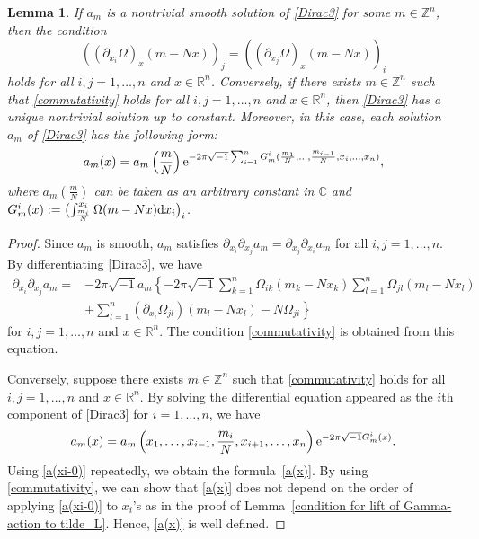 \documentclass[pdftex]{sigma}
\numberwithin{equation}{section}
\newtheorem{Lemma}[Theorem]{Lemma}
\newcommand{\C}{\mathbb{C}}
\newcommand{\R}{\mathbb{R}}
\newcommand{\Z}{\mathbb{Z}}
\begin{document}
\begin{Lemma}\label{basis of kerD}
If $a_m$ is a nontrivial smooth solution of \eqref{Dirac3} for some $m\in \Z^n$, then the condition
\begin{equation}\label{commutativity}
\left(\left(\partial_{x_i}\Omega\right)_x(m-Nx)\right)_j=\left(\left(\partial_{x_j}\Omega\right)_x(m-Nx)\right)_i
\end{equation}
holds  for all $i, j=1,\ldots , n$ and $x\in \R^n$.
Conversely, if there exists $m\in \Z^n$ such that \eqref{commutativity} holds for all $i, j=1,\ldots , n$ and $x\in \R^n$,
then \eqref{Dirac3} has a unique nontrivial solution up to constant. Moreover, in this case, each solution $a_m$ of \eqref{Dirac3} has the following form:
\begin{equation}\label{a(x)}
a_m(x)=a_m\left(\frac{m}{N}\right){\rm e}^{-2\pi\sqrt{-1}\sum_{i=1}^nG_m^i(\frac{m_1}{N},\ldots ,\frac{m_{i-1}}{N},x_i,\ldots ,x_n)},
\end{equation}
where $a_m(\frac{m}{N})$ can be taken as an arbitrary constant in $\C$ and
$
G_m^i(x):=\bigl(\int_{\frac{m_i}{N}}^{x_i}\Omega(m-Nx){\rm d}x_i\bigr)_i $.
\end{Lemma}
\begin{proof}
Since $a_m$ is smooth, $a_m$ satisfies $\partial_{x_i}\partial_{x_j}a_m=\partial_{x_j}\partial_{x_i}a_m$ for all $i, j=1,\ldots ,n$. By differentiating \eqref{Dirac3}, we have
\begin{align*}
\partial_{x_i}\partial_{x_j}a_m={}&-2\pi\sqrt{-1}a_m\left\{-2\pi\sqrt{-1}\sum_{k=1}^n\Omega_{ik}(m_k-Nx_k)\sum_{l=1}^n\Omega_{jl}(m_l-Nx_l)\right.\\
&\left.
+\sum_{l=1}^n\left(\partial_{x_i}\Omega_{jl}\right)(m_l-Nx_l)-N\Omega_{ji}\right\}
\end{align*}
for $i, j=1, \ldots ,n$ and $x\in \R^n$. The condition \eqref{commutativity} is obtained from this equation.

Conversely, suppose there exists $m\in \Z^n$ such that \eqref{commutativity} holds for all $i, j=1,\ldots , n$ and $x\in \R^n$. By solving the differential equation appeared as the $i$th component of \eqref{Dirac3} for $i=1,\ldots ,n$, we have
\begin{equation}\label{a(xi-0)}
a_m(x)=a_m\left(x_1,\ldots ,x_{i-1},\frac{m_i}{N},x_{i+1},\ldots ,x_n\right){\rm e}^{-2\pi\sqrt{-1}G_m^i(x)}.
\end{equation}
Using \eqref{a(xi-0)} repeatedly, we obtain the formula~\eqref{a(x)}.
By using \eqref{commutativity}, we can show that \eqref{a(x)} does not depend on the order of applying \eqref{a(xi-0)} to $x_i$'s as in the proof of Lemma~\ref{condition for lift of Gamma-action to tilde_L}. Hence, \eqref{a(x)} is well defined.
\end{proof}
\end{document}
